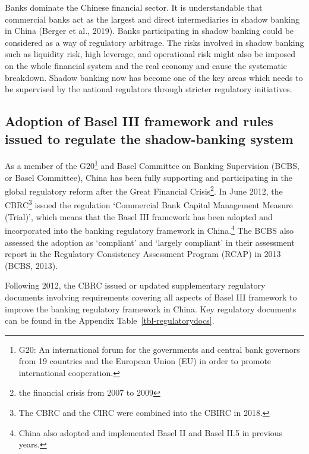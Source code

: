 \documentclass[
  12pt,
  a4paper,
  DIV=11,
  numbers=noendperiod]{scrreprt}
\begin{document}
Banks dominate the Chinese financial sector. It is understandable that
commercial banks act as the largest and direct intermediaries in shadow
banking in China (Berger et al., 2019). Banks participating in shadow
banking could be considered as a way of regulatory arbitrage. The risks
involved in shadow banking such as liquidity risk, high leverage, and
operational risk might also be imposed on the whole financial system and
the real economy and cause the systematic breakdown. Shadow banking now
has become one of the key areas which needs to be supervised by the
national regulators through stricter regulatory initiatives.

\subsection{Adoption of Basel III framework and rules issued to regulate
the shadow-banking
system}\label{adoption-of-basel-iii-framework-and-rules-issued-to-regulate-the-shadow-banking-system}

As a member of the G20\footnote{G20: An international forum for the
  governments and central bank governors from 19 countries and the
  European Union (EU) in order to promote international cooperation.}
and Basel Committee on Banking Supervision (BCBS, or Basel Committee),
China has been fully supporting and participating in the global
regulatory reform after the Great Financial Crisis\footnote{the
  financial crisis from 2007 to 2009}. In June 2012, the CBRC\footnote{The
  CBRC and the CIRC were combined into the CBIRC in 2018.} issued the
regulation `Commercial Bank Capital Management Measure (Trial)', which
means that the Basel III framework has been adopted and incorporated
into the banking regulatory framework in China.\footnote{China also
  adopted and implemented Basel II and Basel II.5 in previous years.}
The BCBS also assessed the adoption as `compliant' and `largely
compliant' in their assessment report in the Regulatory Consistency
Assessment Program (RCAP) in 2013 (BCBS, 2013).

Following 2012, the CBRC issued or updated supplementary regulatory
documents involving requirements covering all aspects of Basel III
framework to improve the banking regulatory framework in China. Key
regulatory documents can be found in the Appendix
Table~\ref{tbl-regulatorydocs}.
\end{document}
